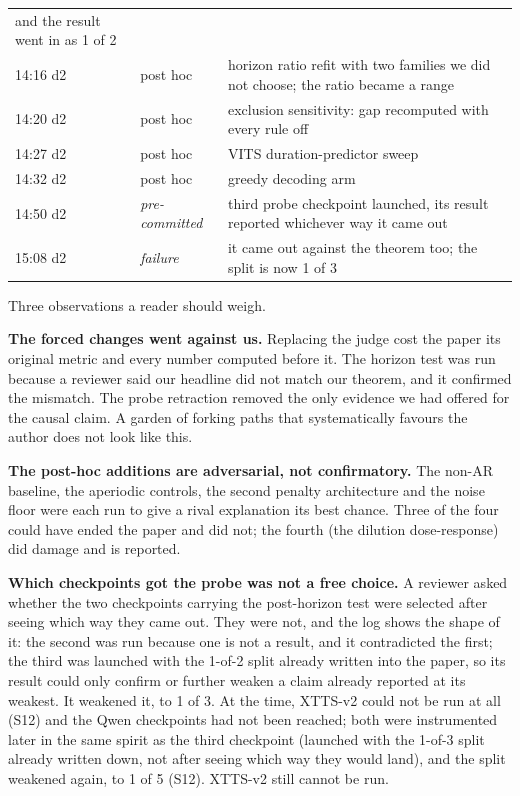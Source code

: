 \documentclass[11pt]{article}
\begin{document}
\begin{longtable}{llp{4.6cm}}
  and the result went in as 1 of 2 \\
14:16 d2 & post hoc & horizon ratio refit with two families we did not choose;
  the ratio became a range \\
14:20 d2 & post hoc & exclusion sensitivity: gap recomputed with every rule off \\
14:27 d2 & post hoc & VITS duration-predictor sweep \\
14:32 d2 & post hoc & greedy decoding arm \\
14:50 d2 & \emph{pre-committed} & third probe checkpoint launched, its result
  reported whichever way it came out \\
15:08 d2 & \emph{failure} & it came out against the theorem too; the split is
  now 1 of 3 \\
\bottomrule
\end{longtable}

Three observations a reader should weigh.

\noindent\textbf{The forced changes went against us.} Replacing the judge cost
the paper its original metric and every number computed before it. The horizon
test was run because a reviewer said our headline did not match our theorem, and
it confirmed the mismatch. The probe retraction removed the only evidence we had
offered for the causal claim. A garden of forking paths that systematically
favours the author does not look like this.

\noindent\textbf{The post-hoc additions are adversarial, not confirmatory.} The
non-AR baseline, the aperiodic controls, the second penalty architecture and the
noise floor were each run to give a rival explanation its best chance. Three of
the four could have ended the paper and did not; the fourth (the dilution
dose-response) did damage and is reported.

\noindent\textbf{Which checkpoints got the probe was not a free choice.} A
reviewer asked whether the two checkpoints carrying the post-horizon test were
selected after seeing which way they came out. They were not, and the log shows
the shape of it: the second was run because one is not a result, and it
contradicted the first; the third was launched with the 1-of-2 split already
written into the paper, so its result could only confirm or further weaken a
claim already reported at its weakest. It weakened it, to 1 of 3. At the time,
XTTS-v2 could not be run at all (S12) and the Qwen checkpoints had not been
reached; both were instrumented later in the same spirit as the third
checkpoint (launched with the 1-of-3 split already written down, not after
seeing which way they would land), and the split weakened again, to 1 of 5
(S12). XTTS-v2 still cannot be run.
\end{document}
